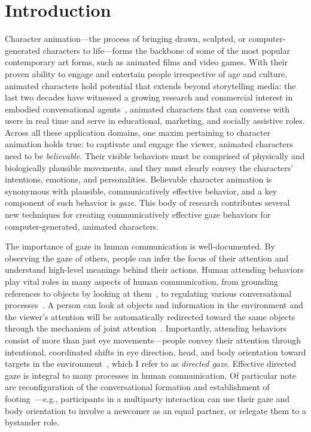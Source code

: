 \pagestyle{deposit}

\chapter{Introduction}

Character animation---the process of bringing drawn, sculpted, or computer-generated characters to life---forms the backbone of some of the most popular contemporary art forms, such as animated films and video games. With their proven ability to engage and entertain people irrespective of age and culture, animated characters hold potential that extends beyond storytelling media: the last two decades have witnessed a growing research and commercial interest in embodied conversational agents~\citep{cassell2000embodied}, animated characters that can converse with users in real time and serve in educational, marketing, and socially assistive roles. Across all these application domains, one maxim pertaining to character animation holds true: to captivate and engage the viewer, animated characters need to be \emph{believable}. Their visible behaviors must be comprised of physically and biologically plausible movements, and they must clearly convey the characters' intentions, emotions, and personalities. Believable character animation is synonymous with plausible, communicatively effective behavior, and a key component of such behavior is \emph{gaze}. This body of research contributes several new techniques for creating communicatively effective gaze behaviors for computer-generated, animated characters.

The importance of gaze in human communication is well-documented. By observing the gaze of others, people can infer the focus of their attention and understand high-level meanings behind their actions. Human attending behaviors play vital roles in many aspects of human communication, from grounding references to objects by looking at them~\citep{hanna2007speakers,preissler2005role}, to regulating various conversational processes~\citep{kendon1990conducting,heylen2006head,mutlu2012conversational}. A person can look at objects and information in the environment and the viewer's attention will be automatically redirected toward the same objects through the mechanism of joint attention~\citep{moore2014joint}.
Importantly, attending behaviors consist of more than just eye movements---people convey their attention through intentional, coordinated shifts in eye direction, head, and body orientation toward targets in the environment~\citep{langton2000eyes}, which I refer to as \emph{directed gaze}.
Effective directed gaze is integral to many processes in human communication. Of particular note are reconfiguration of the conversational formation and establishment of footing~\citep{mutlu2012conversational}---e.g., participants in a multiparty interaction can use their gaze and body orientation to involve a newcomer as an equal partner, or relegate them to a bystander role.

